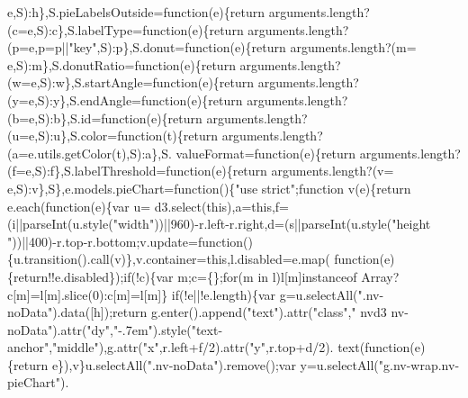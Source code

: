 \begin{DoxyCode}
      e,S):h\},S.pieLabelsOutside=\textcolor{keyword}{function}(e)\{\textcolor{keywordflow}{return} arguments.length?(c=e,S):c\},S.labelType=\textcolor{keyword}{function}(e)\{\textcolor{keywordflow}{return} 
      arguments.length?(p=e,p=p||\textcolor{stringliteral}{"key"},S):p\},S.donut=\textcolor{keyword}{function}(e)\{\textcolor{keywordflow}{return} arguments.length?(m=
      e,S):m\},S.donutRatio=\textcolor{keyword}{function}(e)\{\textcolor{keywordflow}{return} arguments.length?(w=e,S):w\},S.startAngle=\textcolor{keyword}{function}(e)\{\textcolor{keywordflow}{return} 
      arguments.length?(y=e,S):y\},S.endAngle=\textcolor{keyword}{function}(e)\{\textcolor{keywordflow}{return} arguments.length?(b=e,S):b\},S.id=\textcolor{keyword}{function}(e)\{\textcolor{keywordflow}{return} 
      arguments.length?(u=e,S):u\},S.color=\textcolor{keyword}{function}(t)\{\textcolor{keywordflow}{return} arguments.length?(a=e.utils.getColor(t),S):a\},S.
      valueFormat=\textcolor{keyword}{function}(e)\{\textcolor{keywordflow}{return} arguments.length?(f=e,S):f\},S.labelThreshold=\textcolor{keyword}{function}(e)\{\textcolor{keywordflow}{return} arguments.length?(v=
      e,S):v\},S\},e.models.pieChart=\textcolor{keyword}{function}()\{\textcolor{stringliteral}{"use strict"};\textcolor{keyword}{function} v(e)\{\textcolor{keywordflow}{return} e.each(\textcolor{keyword}{function}(e)\{var u=
      d3.select(\textcolor{keyword}{this}),a=\textcolor{keyword}{this},f=(i||parseInt(u.style(\textcolor{stringliteral}{"width"}))||960)-r.left-r.right,d=(s||parseInt(u.style(\textcolor{stringliteral}{"height
      "}))||400)-r.top-r.bottom;v.update=\textcolor{keyword}{function}()\{u.transition().call(v)\},v.container=\textcolor{keyword}{this},l.disabled=e.map(\textcolor{keyword}{
      function}(e)\{\textcolor{keywordflow}{return}!!e.disabled\});\textcolor{keywordflow}{if}(!c)\{var m;c=\{\};\textcolor{keywordflow}{for}(m in l)l[m]instanceof Array?c[m]=l[m].slice(0):c[m]=l[m]\}\textcolor{keywordflow}{
      if}(!e||!e.length)\{var g=u.selectAll(\textcolor{stringliteral}{".nv-noData"}).data([h]);\textcolor{keywordflow}{return} g.enter().append(\textcolor{stringliteral}{"text"}).attr(\textcolor{stringliteral}{"class"},\textcolor{stringliteral}{"
      nvd3 nv-noData"}).attr(\textcolor{stringliteral}{"dy"},\textcolor{stringliteral}{"-.7em"}).style(\textcolor{stringliteral}{"text-anchor"},\textcolor{stringliteral}{"middle"}),g.attr(\textcolor{stringliteral}{"x"},r.left+f/2).attr(\textcolor{stringliteral}{"y"},r.top+d/2).
      text(\textcolor{keyword}{function}(e)\{\textcolor{keywordflow}{return} e\}),v\}u.selectAll(\textcolor{stringliteral}{".nv-noData"}).remove();var y=u.selectAll(\textcolor{stringliteral}{"g.nv-wrap.nv-pieChart"}).

\end{DoxyCode}
